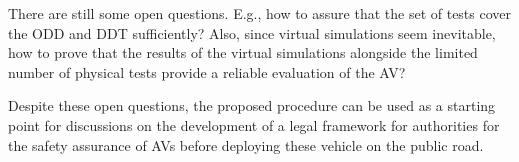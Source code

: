 \documentclass[twoside,twocolumn,9pt]{article}
\theoremstyle{plain}
\theoremstyle{remark}\newtheorem{remarkenv}{Remark}        %
\begin{document}
There are still some open questions. E.g., how to assure that the set of tests cover the ODD and DDT sufficiently? Also, since virtual simulations seem inevitable, how to prove that the results of the virtual simulations alongside the limited number of physical tests provide a reliable evaluation of the AV?

Despite these open questions, the proposed procedure can be used as a starting point for discussions on the development of a legal framework for authorities for the safety assurance of AVs before deploying these vehicle on the public road. 






\end{document}
